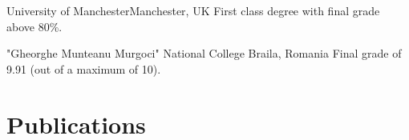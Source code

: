 \documentclass[11pt,a4paper,roman]{moderncv} %
\begin{document}
        {University of Manchester}{Manchester, UK}{}
        {
          First class degree with final grade above 80\%.
        }
  
        {"Gheorghe Munteanu Murgoci" National College}
        {Braila, Romania}{}
        {Final grade of 9.91 (out of a maximum of 10).}


\section{Publications}

\end{document}
